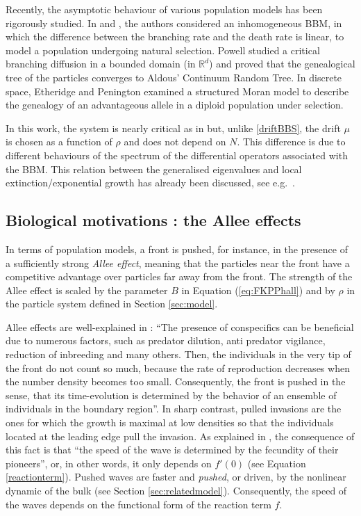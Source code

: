 \documentclass[11pt]{article}
\theoremstyle{plain}
\begin{document}
Recently, the asymptotic behaviour of various population models has been rigorously studied. In \cite{fitnesswave} and \cite{liu2021particle}, the authors considered an inhomogeneous BBM, in which the difference between the branching rate and the death rate is linear,  to model a population undergoing natural selection.  Powell \cite{powell2019invariance} studied a critical branching diffusion in a bounded domain (in $\mathbb{R}^d$) and proved that the genealogical tree of the particles converges to Aldous’ Continuum Random Tree. In discrete space, Etheridge and Penington \cite{etheridge2020genealogies} examined a structured Moran model to describe the genealogy of an advantageous allele in a diploid population under selection.

In this work, the system is nearly critical as in \cite{Berestycki2010} but, unlike \eqref{driftBBS}, the drift $\mu$ is chosen as a function of $\rho$ and does not depend on $N$. This difference is due to different behaviours of the spectrum of the differential operators associated with the BBM. This relation between the generalised eigenvalues and local extinction/exponential growth has already been discussed, see e.g.~\cite{Englander:2004aa}\cite{powell2019invariance}. 



\subsection{Biological motivations : the Allee effects}\label{sec:allee}


In terms of population models, a front is pushed, for instance, in the presence of a sufficiently strong \emph{Allee effect}, meaning that the particles near the front have a competitive advantage over particles far away from the front. The strength of the Allee effect is scaled by the parameter $B$ in Equation (\ref{eq:FKPPhall}) and by $\rho$ in the particle system defined in Section \ref{sec:model}.

Allee effects are well-explained in \cite{Birzu2018}: ``The presence of conspecifics can be beneficial due to numerous factors, such as predator dilution, anti predator vigilance, reduction of inbreeding and many others. Then, the individuals in the very tip of the front do not count so much, because the rate of reproduction decreases when the number density becomes too small. Consequently, the front is pushed in the sense, that its time-evolution is determined by the behavior of an ensemble of individuals in the boundary region''. In sharp contrast, pulled invasions are the ones for which the growth is maximal at low densities so that the individuals located at the leading edge pull the invasion. As explained in  \cite{stokes1976two}, the consequence of this fact is that ``the speed of the wave is determined by the fecundity of their pioneers'', or, in other words, it only depends on $f'(0)$ (see Equation \eqref{reactionterm}). Pushed waves are faster and \textit{pushed}, or driven, by the nonlinear dynamic of the bulk (see Section \ref{sec:relatedmodel}). Consequently, the speed of the waves depends on the functional form of the reaction term $f$. 
\end{document}
